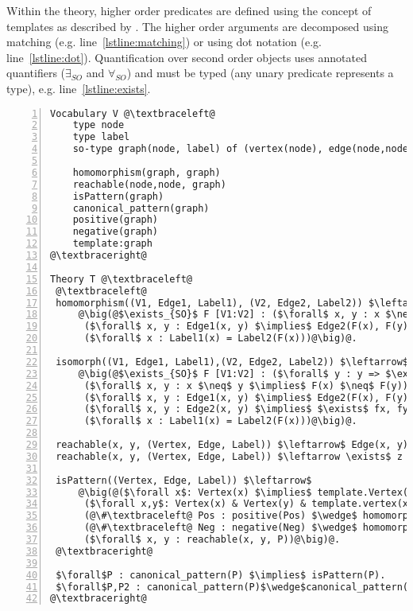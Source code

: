 Within the theory, higher order predicates are defined using the concept of templates as described by \cite{DBLP:journals/tplp/DassevilleHJD15}. %
The higher order arguments are decomposed using matching (e.g. line~\ref{lstline:matching}) or using dot notation (e.g. line~\ref{lstline:dot}).
Quantification over second order objects uses annotated quantifiers ($\exists_{SO}$ and $\forall_{SO}$) and must be typed (any unary predicate represents a type), e.g. line~\ref{lstline:exists}.

\begin{lstlisting}[mathescape,style=model,caption={Faithful encoding},label=lst:faithful, numbers=left]
Vocabulary V @\textbraceleft@
    type node
    type label
    so-type graph(node, label) of (vertex(node), edge(node,node), label(node):label)
    
    homomorphism(graph, graph)
    reachable(node,node, graph)
    isPattern(graph)
    canonical_pattern(graph)
    positive(graph)
    negative(graph)
    template:graph
@\textbraceright@ 

Theory T @\textbraceleft@ 
 @\textbraceleft@
 homomorphism((V1, Edge1, Label1), (V2, Edge2, Label2)) $\leftarrow$@\label{lstline:matching}@
     @\big(@$\exists_{SO}$ F [V1:V2] : ($\forall$ x, y : x $\neq$ y $\implies$ F(x) $\neq$ F(y)) $\wedge$@\label{lstline:exists}@
      ($\forall$ x, y : Edge1(x, y) $\implies$ Edge2(F(x), F(y))) $\wedge$
      ($\forall$ x : Label1(x) = Label2(F(x)))@\big)@.

 isomorph((V1, Edge1, Label1),(V2, Edge2, Label2)) $\leftarrow$
     @\big(@$\exists_{SO}$ F [V1:V2] : ($\forall$ y : y => $\exists$ x : F(x)=y) $\land$ 
      ($\forall$ x, y : x $\neq$ y $\implies$ F(x) $\neq$ F(y)) $\wedge$
      ($\forall$ x, y : Edge1(x, y) $\implies$ Edge2(F(x), F(y))) $\wedge$              
      ($\forall$ x, y : Edge2(x, y) $\implies$ $\exists$ fx, fy : Edge1(fx, fy) $\land$ x = F(fx) $\land$ y = F(fy)) $\wedge$
      ($\forall$ x : Label1(x) = Label2(F(x)))@\big)@.

 reachable(x, y, (Vertex, Edge, Label)) $\leftarrow$ Edge(x, y) $\lor$ Edge(y, x).
 reachable(x, y, (Vertex, Edge, Label)) $\leftarrow \exists$ z : reachable(x, z, (Edge, Label)) $\wedge$ reachable(z, y, (Edge, Label)).

 isPattern((Vertex, Edge, Label)) $\leftarrow$
     @\big(@($\forall x$: Vertex(x) $\implies$ template.Vertex(x)) $\land$@\label{lstline:dot}@
      ($\forall x,y$: Vertex(x) & Vertex(y) & template.vertex(x) & template.vertex(y) & template.Edge(x,y) $\implies$ Edge(x,y)) $\land$ 
      (@\#\textbraceleft@ Pos : positive(Pos) $\wedge$ homomorphism(P, Pos) @\textbraceright@ $\geq$ $N_{+}$) $\land$
      (@\#\textbraceleft@ Neg : negative(Neg) $\wedge$ homomorphism(P, Neg) @\textbraceright@ $\leq$ $N_{-}$) $\land$
      ($\forall$ x, y : reachable(x, y, P))@\big)@.
 @\textbraceright@
      
 $\forall$P : canonical_pattern(P) $\implies$ isPattern(P). 
 $\forall$P,P2 : canonical_pattern(P)$\wedge$canonical_pattern(P2)$\wedge$P$\neq$P2 $\implies$ $\neg$isomorph(P, P2).
@\textbraceright@ 
\end{lstlisting}

